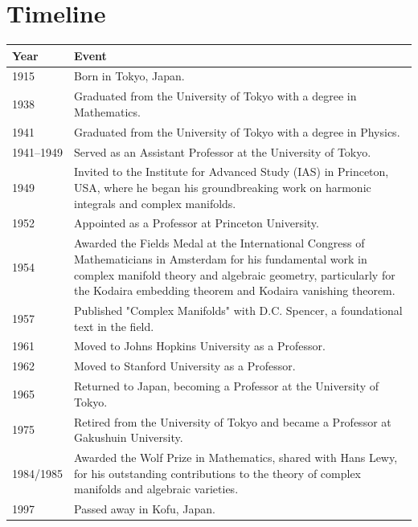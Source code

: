 \section*{Timeline}
\begin{tabularx}{\linewidth}{|p{1.5cm}|>{\raggedright\arraybackslash}X|}
\hline
\textbf{Year} & \textbf{Event} \\ \hline
1915 & Born in Tokyo, Japan. \\ \hline
1938 & Graduated from the University of Tokyo with a degree in Mathematics. \\ \hline
1941 & Graduated from the University of Tokyo with a degree in Physics. \\ \hline
1941--1949 & Served as an Assistant Professor at the University of Tokyo. \\ \hline
1949 & Invited to the Institute for Advanced Study (IAS) in Princeton, USA, where he began his groundbreaking work on harmonic integrals and complex manifolds. \\ \hline
1952 & Appointed as a Professor at Princeton University. \\ \hline
1954 & Awarded the Fields Medal at the International Congress of Mathematicians in Amsterdam for his fundamental work in complex manifold theory and algebraic geometry, particularly for the Kodaira embedding theorem and Kodaira vanishing theorem. \\ \hline
1957 & Published "Complex Manifolds" with D.C. Spencer, a foundational text in the field. \\ \hline
1961 & Moved to Johns Hopkins University as a Professor. \\ \hline
1962 & Moved to Stanford University as a Professor. \\ \hline
1965 & Returned to Japan, becoming a Professor at the University of Tokyo. \\ \hline
1975 & Retired from the University of Tokyo and became a Professor at Gakushuin University. \\ \hline
1984/1985 & Awarded the Wolf Prize in Mathematics, shared with Hans Lewy, for his outstanding contributions to the theory of complex manifolds and algebraic varieties. \\ \hline
1997 & Passed away in Kofu, Japan. \\ \hline
\end{tabularx}

